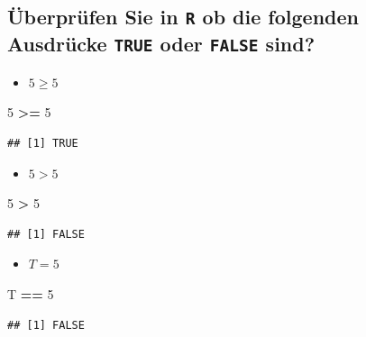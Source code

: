 \documentclass[12pt,a4paper]{article}
\newenvironment{Shaded}{\begin{snugshade}}{\end{snugshade}}
\newcommand{\DecValTok}[1]{\textcolor[rgb]{0.00,0.00,0.81}{#1}}
\newcommand{\NormalTok}[1]{#1}
\newcommand{\SpecialCharTok}[1]{\textcolor[rgb]{0.81,0.36,0.00}{\textbf{#1}}}
\begin{document}
\hypertarget{uxfcberpruxfcfen-sie-in-r-ob-die-folgenden-ausdruxfccke-true-oder-false-sind}{%
\subsection{\texorpdfstring{Überprüfen Sie in \texttt{R} ob die
folgenden Ausdrücke \texttt{TRUE} oder \texttt{FALSE}
sind?}{Überprüfen Sie in R ob die folgenden Ausdrücke TRUE oder FALSE sind?}}\label{uxfcberpruxfcfen-sie-in-r-ob-die-folgenden-ausdruxfccke-true-oder-false-sind}}

\begin{itemize}
  \item $5 \geq 5$
\end{itemize}

\begin{Shaded}
\begin{Highlighting}[]
    \DecValTok{5} \SpecialCharTok{\textgreater{}=} \DecValTok{5}
\end{Highlighting}
\end{Shaded}

\begin{verbatim}
## [1] TRUE
\end{verbatim}

\begin{itemize}
  \item $5 > 5$
\end{itemize}

\begin{Shaded}
\begin{Highlighting}[]
    \DecValTok{5} \SpecialCharTok{\textgreater{}} \DecValTok{5}
\end{Highlighting}
\end{Shaded}

\begin{verbatim}
## [1] FALSE
\end{verbatim}

\begin{itemize}
  \item $T = 5$
\end{itemize}

\begin{Shaded}
\begin{Highlighting}[]
\NormalTok{    T }\SpecialCharTok{==} \DecValTok{5}
\end{Highlighting}
\end{Shaded}

\begin{verbatim}
## [1] FALSE
\end{verbatim}
\end{document}

